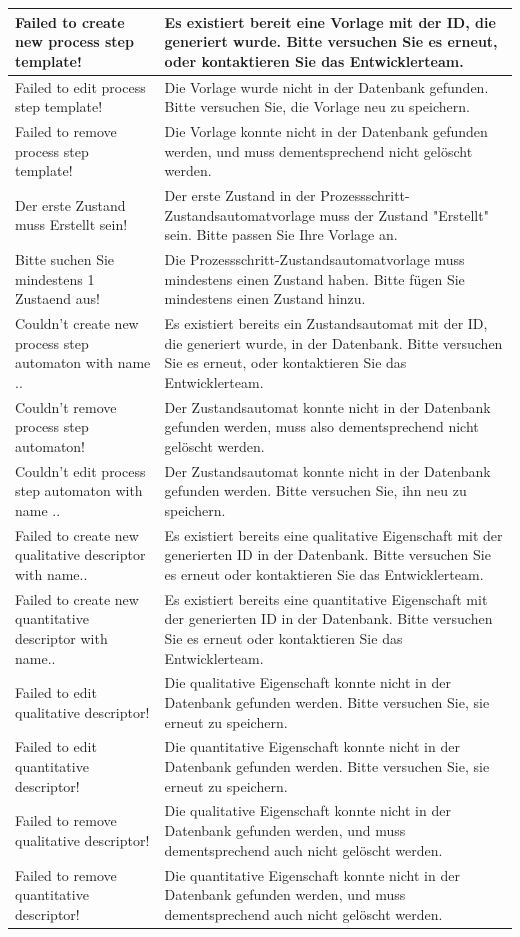 \documentclass[enabledeprecatedfontcommands,fontsize=12pt,paper=a4,twoside]{scrartcl}
\begin{document}
\begin{longtable}[c]{|p{5cm}|p{10cm}|}
Failed to create new process step template! & Es existiert bereit eine Vorlage mit der ID, die generiert wurde. Bitte versuchen Sie es erneut, oder kontaktieren Sie das Entwicklerteam.\\ \hline
Failed to edit process step template! & Die Vorlage wurde nicht in der Datenbank gefunden. Bitte versuchen Sie, die Vorlage neu zu speichern. \\ \hline
Failed to remove process step template! & Die Vorlage konnte nicht in der Datenbank gefunden werden, und muss dementsprechend nicht gelöscht werden. \\ \hline
Der erste Zustand muss Erstellt sein! & Der erste Zustand in der Prozessschritt-Zustandsautomatvorlage muss der Zustand "Erstellt" sein. Bitte passen Sie Ihre Vorlage an.\\ \hline
Bitte suchen Sie mindestens 1 Zustaend aus! & Die Prozessschritt-Zustandsautomatvorlage muss mindestens einen Zustand haben. Bitte fügen Sie mindestens einen Zustand hinzu. \\ \hline
Couldn't create new process step automaton with name ..  & Es existiert bereits ein Zustandsautomat mit der ID, die generiert wurde, in der Datenbank. Bitte versuchen Sie es erneut, oder kontaktieren Sie das Entwicklerteam.  \\ \hline
Couldn't remove process step automaton! & Der Zustandsautomat konnte nicht in der Datenbank gefunden werden, muss also dementsprechend nicht gelöscht werden. \\ \hline
Couldn't edit process step automaton with name ..& Der Zustandsautomat konnte nicht in der Datenbank gefunden werden. Bitte versuchen Sie, ihn neu zu speichern. \\ \hline
Failed to create new qualitative descriptor with name.. & Es existiert bereits eine qualitative Eigenschaft mit der generierten ID in der Datenbank. Bitte versuchen Sie es erneut oder kontaktieren Sie das Entwicklerteam. \\ \hline
Failed to create new quantitative descriptor with name.. & Es existiert bereits eine quantitative Eigenschaft mit der generierten ID in der Datenbank. Bitte versuchen Sie es erneut oder kontaktieren Sie das Entwicklerteam. \\ \hline
Failed to edit qualitative descriptor! & Die qualitative Eigenschaft konnte nicht in der Datenbank gefunden werden. Bitte versuchen Sie, sie erneut zu speichern. \\ \hline
Failed to edit quantitative descriptor! & Die quantitative Eigenschaft konnte nicht in der Datenbank gefunden werden. Bitte versuchen Sie, sie erneut zu speichern. \\ \hline
Failed to remove qualitative descriptor! & Die qualitative Eigenschaft konnte nicht in der Datenbank gefunden werden, und muss dementsprechend auch nicht gelöscht werden. \\ \hline
Failed to remove quantitative descriptor! & Die quantitative Eigenschaft konnte nicht in der Datenbank gefunden werden, und muss dementsprechend auch nicht gelöscht werden.  \\ \hline
\end{longtable}
\end{document}
